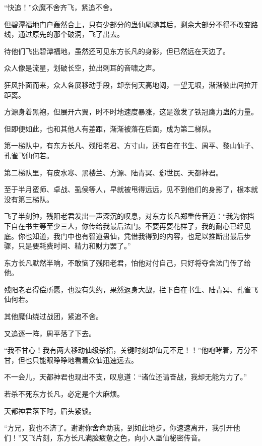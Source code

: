 
\begin{this_body}



“快追！”众魔不舍齐飞，紧追不舍。

但碧潭福地门户轰然合上，只有少部分的蛊仙尾随其后，剩余大部分不得不改变路线，通过原先的那个破洞，飞了出去。

待他们飞出碧潭福地，虽然还可见东方长凡的身影，但已然远在天边了。

众人像是流星，划破长空，拉出刺耳的音啸之声。

狂风扑面而来，众人各展移动手段，却奈何天高地阔，一望无垠，渐渐彼此间拉开距离。

方源身着黑袍，但展开六翼，时不时地速度暴涨，这是激发了铁冠鹰力蛊的力量。

但即便如此，也和其他人有差距，渐渐被落在后面，成为第二梯队。

第一梯队中，有东方长凡、残阳老君、方寸山，还有自在书生、周平、黎山仙子、孔雀飞仙何若。

第二梯队里，有皮水寒、黑楼兰、方源、陆青冥、郄世民、天都神君。

至于半月蛮师、卓战、虱侯等人，早就被甩得远远，见不到他们的身影了，根本就没有第三梯队。

飞了半刻钟，残阳老君发出一声深沉的叹息，对东方长凡郑重传音道：“我为你挡下自在书生等至少三人，你传给我最后法门。不要再耍花样了，我的耐心已经见底。你也知道，我门中也有智道蛊仙，凭借我得到的内容，也足以推断出最后步骤，只是要耗费时间、精力和财力罢了。”

东方长凡默然半晌，不敢恼了残阳老君，怕他对付自己，只好将夺舍法门传了给他。

残阳老君得偿所愿，也没有失约，果然返身大战，拦下自在书生、陆青冥、孔雀飞仙何若。

其他魔仙绕过战团，紧追不舍。

又追逐一阵，周平落了下去。

“我不甘心！我有两大移动仙级杀招，关键时刻却仙元不足！！”他咆哮着，万分不甘，但也只能眼睁睁地看着众仙迅速远去。

不一会儿，天都神君也现出不支，叹息道：“诸位还请奋战，我却无能为力了。”

若杀不死东方长凡，必定是个大麻烦。

天都神君落下时，眉头紧锁。

“方兄，我也不济了。谢谢你舍命助我，到如此地步。你速速离开，我引开他们！”又飞片刻，东方长凡满脸疲惫之色，向小人蛊仙秘密传音。


\end{this_body}
